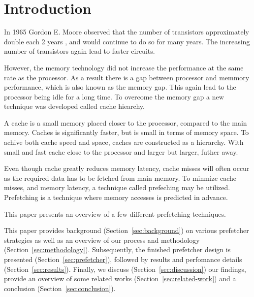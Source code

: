 \section{Introduction}
\label{sec:introduction}

In 1965 Gordon E. Moore observed that the number of transistors approximately double each 2 years \cite{bib:moore},
and would continue to do so for many years.
The increasing number of transistors again lead to faster circuits.

However, the memory technology did not increase the performance at the same rate as the processor.
As a result there is a gap between processor and memmory performance, which is also known as the memory gap.
This again lead to the processor being idle for a long time.
To overcome the memory gap a new technique was developed called cache hiearchy.

A cache is a small memory placed closer to the processor, compared to the main memory.
Caches is significantly faster, but is small in terms of memory space.
To achive both cache speed and space, caches are constructed as a hierarchy.
With small and fast cache close to the processor and larger but larger, futher away.

Even though cache greatly reduces memory latency, cache misses will often occur as the required data has to be fetched from main memory.
To minmize cache misses, and memory latency, a technique called prefeching may be utilized.
Prefetching is a technique where memory accesses is predicted in advance.

This paper presents an overview of a few different prefetching techniques.

This paper provides background (Section~\ref{sec:background}) on various prefetcher strategies as well as an overview of our process and methodology (Section~\ref{sec:methodology}).
Subsequently, the finished prefetcher design is presented (Section~\ref{sec:prefetcher}), followed by results and perfomance details (Section~\ref{sec:results}).
Finally, we discuss (Section~\ref{sec:discussion}) our findings,
provide an overview of some related works (Section~\ref{sec:related-work}) and a conclusion (Section~\ref{sec:conclusion}).


